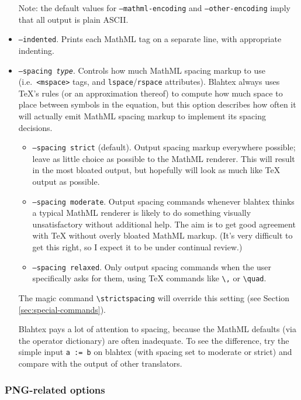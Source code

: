 \documentclass{article}
\newcommand{\texcommand}[1]{\textbackslash{}#1}
\begin{document}
\begin{itemize}
Note: the default values for \texttt{--mathml-encoding} and \texttt{--other-encoding} imply that all output is plain ASCII.
\item \texttt{--indented}. Prints each MathML tag on a separate line, with appropriate indenting.
\item \texttt{--spacing \textit{type}}. Controls how much MathML spacing markup to use (i.e.~\texttt{<mspace>} tags, and \texttt{lspace}/\texttt{rspace} attributes). Blahtex always uses \TeX{}'s rules (or an approximation thereof) to compute how much space to place between symbols in the equation, but this option describes how often it will actually emit MathML spacing markup to implement its spacing decisions.
\begin{itemize}
\item \texttt{--spacing strict} (default). Output spacing markup everywhere possible; leave as little choice as possible to the MathML renderer. This will result in the most bloated output, but hopefully will look as much like \TeX{} output as possible.
\item \texttt{--spacing moderate}. Output spacing commands whenever blahtex thinks a typical MathML renderer is likely to do something visually unsatisfactory without additional help. The aim is to get good agreement with \TeX{} without overly bloated MathML markup. (It's very difficult to get this right, so I expect it to be under continual review.)
\item \texttt{--spacing relaxed}. Only output spacing commands when the user specifically asks for them, using \TeX{} commands like \texttt{\texcommand{,}} or \texttt{\texcommand{quad}}.
\end{itemize}
The magic command \texttt{\texcommand{strictspacing}} will override this setting (see Section \ref{sec:special-commands}).

Blahtex pays a lot of attention to spacing, because the MathML defaults (via the operator dictionary) are often inadequate. To see the difference, try the simple input \texttt{a := b} on blahtex (with spacing set to moderate or strict) and compare with the output of other translators.
\end{itemize}

\subsubsection{PNG-related options}
\end{document}
